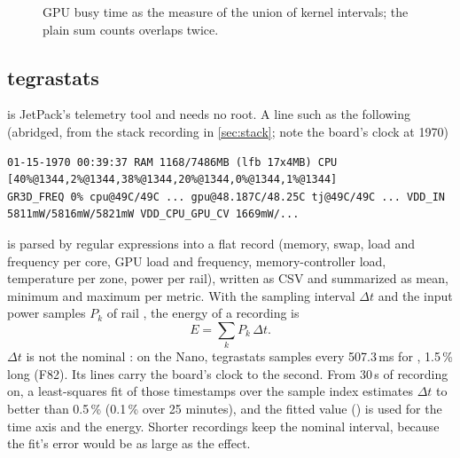 \documentclass[11pt,a4paper]{article}
\newcommand{\finding}[1]{\textsf{\small F#1}}
\begin{document}
\begin{figure}[H]
\centering
{}
\caption{GPU busy time as the measure of the union of kernel intervals; the plain sum counts overlaps twice.}\label{fig:union}
\end{figure}

\subsection{tegrastats}
 is JetPack's telemetry tool and needs no root. A line such as the following (abridged, from the stack
recording in \cref{sec:stack}; note the board's clock at 1970)
\begin{lstlisting}
01-15-1970 00:39:37 RAM 1168/7486MB (lfb 17x4MB) CPU [40%@1344,2%@1344,38%@1344,20%@1344,0%@1344,1%@1344]
GR3D_FREQ 0% cpu@49C/49C ... gpu@48.187C/48.25C tj@49C/49C ... VDD_IN 5811mW/5816mW/5821mW VDD_CPU_GPU_CV 1669mW/...
\end{lstlisting}
is parsed by regular expressions into a flat record (memory, swap, load and frequency per core, GPU load and
frequency, memory-controller load, temperature per zone, power per rail), written as CSV and summarized as mean,
minimum and maximum per metric. With the sampling interval $\Delta t$ and the input power samples $P_k$ of rail
, the energy of a recording is
\begin{equation}
  E = \sum_k P_k\, \Delta t .
\end{equation}
$\Delta t$ is not the nominal : on the Nano, tegrastats samples every 507.3\,ms for
, 1.5\,\% long (\finding{82}). Its lines carry the board's clock to the second. From 30\,s of
recording on, a least-squares fit of those timestamps over the sample index estimates $\Delta t$ to better than
0.5\,\% (0.1\,\% over 25 minutes), and the fitted value () is used for the time axis and the
energy. Shorter recordings keep the nominal interval, because the fit's error would be as large as the effect.
\end{document}
